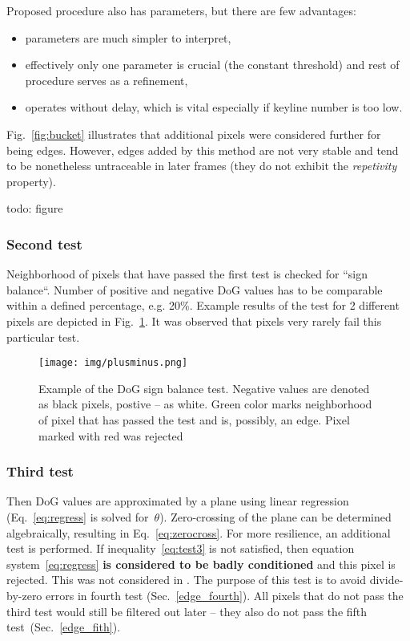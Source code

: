 Proposed procedure also has parameters, but there are few advantages:
\begin{itemize}
	\item parameters are much simpler to interpret,
	\item effectively only one parameter is crucial (the constant threshold) and rest of procedure serves as a refinement,
	\item operates without delay, which is vital especially if keyline number is too low.
\end{itemize}

Fig.~\ref{fig:bucket} illustrates that additional pixels were considered further for being edges. However, edges added by this method are not very stable and tend to be nonetheless untraceable in later frames (they do not exhibit the \textit{repetivity} property).

todo: figure

\subsubsection{Second test}
\label{edge_second}

Neighborhood of pixels that have passed the first test is checked for ``sign balance``. Number of positive and negative DoG values has to be comparable within a defined percentage, e.g. 20\%. Example results of the test for 2 different pixels are depicted in Fig.~\ref{fig:plusminus}. It was observed that pixels very rarely fail this particular test.

\begin{figure}[ht]
	\centering\texttt{[image: img/plusminus.png]}
	\caption{ Example of the DoG sign balance test. Negative values are denoted as black pixels, postive -- as white. Green color marks neighborhood of pixel that has passed the test and is, possibly, an edge. Pixel marked with red was rejected }
	\label{fig:plusminus}
\end{figure}

\subsubsection{Third test}
\label{edge_third}

Then DoG values are approximated by a plane using linear regression (Eq.~\ref{eq:regress} is solved for~$\theta$). Zero-crossing of the plane can be determined algebraically, resulting in Eq.~\ref{eq:zerocross}. For more resilience, an additional test is performed. If inequality~\ref{eq:test3} is not satisfied, then equation system~\ref{eq:regress} \textbf{is considered to be badly conditioned} and this pixel is rejected. This was not considered in \cite{jose2015realtime}. The purpose of this test is to avoid divide-by-zero errors in fourth test (Sec.~\ref{edge_fourth}). All pixels that do not pass the third test would still be filtered out later -- they also do not pass the fifth test~(Sec.~\ref{edge_fith}).

